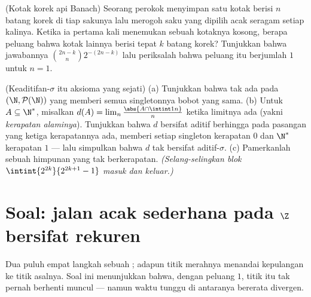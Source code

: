 \begin{exercise}[$\star\star$]\label{exo:b2:proba:11}
(Kotak korek api Banach) Seorang perokok menyimpan satu kotak berisi $n$ batang korek di
tiap sakunya lalu merogoh saku yang dipilih acak seragam setiap
kalinya. Ketika ia pertama kali menemukan sebuah kotaknya kosong, berapa peluang
bahwa kotak lainnya berisi tepat $k$ batang korek? Tunjukkan bahwa
jawabannya $\binom{2n-k}{n}2^{-(2n-k)}$ lalu periksalah bahwa peluang
itu berjumlah $1$ untuk $n = 1$.
\end{exercise}

\begin{exercise}[$\star\star\star$]\label{exo:b2:proba:12}
(Keaditifan-$\sigma$ itu aksioma yang sejati)
(a) Tunjukkan bahwa tak ada  pada $(\N,
\mathcal P(\N))$ yang memberi semua singletonnya bobot yang sama.
(b) Untuk $A \subseteq \N^*$, misalkan $d(A) =
\lim_n\frac{\abs{A\cap\intint1n}}{n}$ ketika limitnya ada
(yakni \emph{kerapatan alaminya}). Tunjukkan bahwa $d$ bersifat aditif berhingga
pada pasangan yang ketiga kerapatannya ada, memberi setiap
singleton kerapatan $0$ dan $\N^*$ kerapatan $1$ --- lalu simpulkan
bahwa $d$ tak bersifat aditif-$\sigma$.
(c) Pamerkanlah sebuah himpunan yang tak berkerapatan. \emph{(Selang-selingkan blok
$\intint{2^{2k}}{2^{2k+1}-1}$ masuk dan keluar.)}
\end{exercise}

\section{Soal: jalan acak sederhana pada $\Z$ bersifat rekuren}

\begin{omfigure}

{\small Dua puluh empat langkah sebuah ; adapun titik
merahnya menandai kepulangan ke titik asalnya. Soal ini menunjukkan bahwa,
dengan peluang $1$, titik itu tak pernah berhenti muncul --- namun
waktu tunggu di antaranya bererata divergen.}
\end{omfigure}


